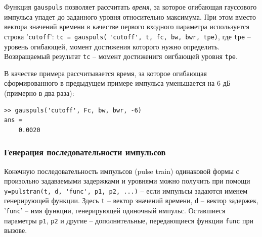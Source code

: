 \documentclass[12pt,a4paper]{article}
\begin{document}
Функция \verb|gauspuls| позволяет рассчитать \emph{время}, за которое огибающая гауссового импульса упадет до заданного уровня относительно максимума. При этом вместо вектора значений времени в качестве первого входного параметра используется строка '\verb|cutoff|': \verb|tc = gauspuls(| \verb|'cutoff', t, fc, bw, bwr, tpe)|, где \verb|tpe| -- уровень огибающей, момент достижения которого нужно определить. Возвращаемый результат \verb|tc| -- момент достиженигя оигбающей уровня \verb|tpe|.

В качестве примера рассчитывается время, за которое огибающая сформированного в предыдущем примере импульса уменьшается на 6 дБ (примерно в два раза):
\begin{verbatim}
>> gauspuls('cutoff', Fc, bw, bwr, -6)
ans =
    0.0020
\end{verbatim}

\subsubsection{Генерация последовательности импульсов}
Конечную последовательность импульсов (pulse train) одинаковой формы с произольно задаваемыми задержками и уровнями можно получить при помощи \verb|y=pulstran(t, d, 'func', p1, p2, ...)| -- если импульсы задаются именем генерирующей функции. Здесь \verb|t| -- вектор значений времени, \verb|d| -- вектор задержек, '\verb|func|' -- имя функции, генерирующей одиночный импульс. Оставшиеся параметры \verb|p1|, \verb|p2| и другие -- дополнительные, передающиеся функции \verb|func| при вызове.
\end{document}
